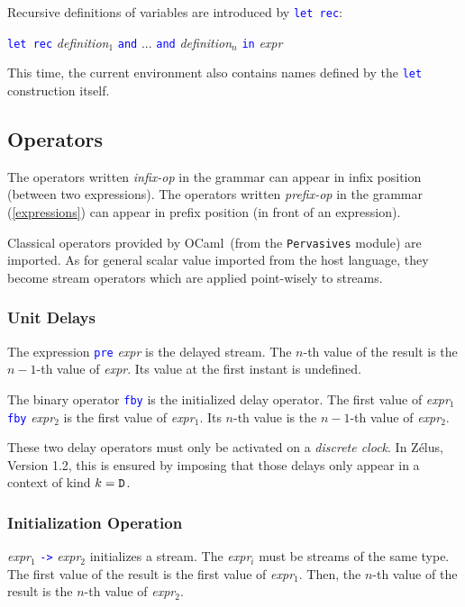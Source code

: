 \documentclass[11pt,titlepage,twoside]{report}
\newcommand{\zelus}{{\sf Z\'elus}}
\newcommand{\ocaml}{{\sf OCaml}}
\newcommand{\Let}{\mbox{{\tt let}}}
\newcommand{\Rec}{\mbox{{\tt rec}}}
\newcommand{\In}{\mbox{{\tt in}}}
\newcommand{\And}{\mbox{{\tt and}}}
\newcommand{\Pre}{\mbox{{\tt pre}}}
\newcommand{\Fby}{\mbox{{\tt fby}}}
\newcommand{\Minusgreater}{\mbox{{\tt ->}}}
\newcommand{\term}[1]{\textcolor{Blue}{\tt #1}}
\newcommand{\nterm}[1]{\textcolor{BrickRed}{\it #1}}
\newcommand{\term}[1]{{\tt #1}}
\newcommand{\nterm}[1]{{\em #1}}
\begin{document}
Recursive definitions of variables are introduced by \term{\Let\ \Rec}:
\begin{center}
  \term{\Let\ \Rec} \nterm{definition}$_1$ \term{\And} ... 
  \term{\And} \nterm{definition}$_n$ \term{\In} \nterm{expr}
\end{center}

This time, the current environment also contains names defined by the \term{\Let}
construction itself.

\subsection{Operators\label{operators}} %

The operators written \nterm{infix-op} in the grammar can appear in
infix position (between two expressions). The operators written
\nterm{prefix-op} in the grammar (\cref{expressions}) can appear
in prefix position (in front of an expression).

Classical operators provided by \ocaml\ (from the {\tt Pervasives}
module) are imported. As for general scalar value imported from the
host language, they become stream operators which are applied
point-wisely to streams.

\subsubsection{Unit Delays} %

The expression \term{\Pre} \nterm{expr} is the delayed
stream. The $n$-th value of the result is the $n-1$-th
value of \nterm{expr}. Its value at the first instant is undefined.

The binary operator \term{\Fby} is the initialized delay operator. The
first value of \nterm{expr}$_1$ \term{\Fby} \nterm{expr}$_2$ is the
first value of \nterm{expr}$_1$. Its $n$-th value is the $n-1$-th
value of \nterm{expr}$_2$.

These two delay operators must only be activated on a \emph{discrete clock}. In
\zelus, Version 1.2, this is ensured by imposing that those delays only
appear in a context of kind $k = \mathtt{D}$.

\subsubsection{Initialization Operation} %

\nterm{expr}$_1$ \term{\Minusgreater} \nterm{expr}$_2$ initializes a
stream. The \nterm{expr}$_i$ must be streams of the same type. The
first value of the result is the first value of
\nterm{expr}$_1$. Then, the $n$-th value of the result is the $n$-th
value of \nterm{expr}$_2$.
\end{document}
